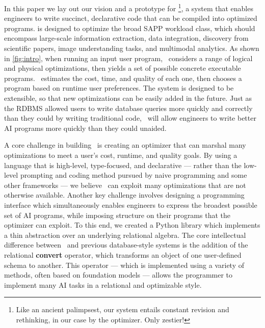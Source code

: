 In this paper we lay out our vision and a prototype for \system\footnote{Like an ancient palimpsest, our system entails constant revision and rethinking, in our case by the optimizer. Only zestier!}, a system that enables engineers to write succinct, declarative code that can be compiled into optimized programs. \system{} is designed to optimize the broad SAPP workload class, which should encompass large-scale information extraction, data integration, discovery from scientific papers,  image understanding tasks, and multimodal analytics. As shown in \autoref{fig:intro}, when running an input user program, \system\ considers a range of logical and physical optimizations, then yields a set of possible concrete executable programs. \system\ estimates the cost, time, and quality of each one, then chooses a program based on runtime user preferences. The system is designed to be extensible, so that new optimizations can be easily added in the future. Just as the RDBMS allowed users to write database queries more quickly and correctly than they could by writing traditional code, \system\ will allow engineers to write better AI programs more quickly than they could unaided.

 A core challenge in building \system\ is creating an optimizer that can marshal many optimizations to meet a user's cost, runtime, and quality goals. By using a language that is high-level, type-focused, and declarative --- rather than the low-level prompting and coding method pursued by naive programming and some other frameworks \cite{langchain, zheng2023efficiently} --- we believe \system\ can exploit many optimizations that are not otherwise available. Another key challenge involves designing a programming interface which simultaneously enables engineers to express the broadest possible set of AI programs, while imposing structure on their programs that the optimizer can exploit. To this end, we created a Python library which implements a thin abstraction over an underlying relational algebra. The core intellectual difference between \system\ and previous database-style systems is the addition of the relational {\bf convert} operator, which transforms an object of one user-defined schema to another. This operator --- which is implemented using a variety of methods, often based on foundation models --- allows the programmer to implement many AI tasks in a relational and optimizable style.

